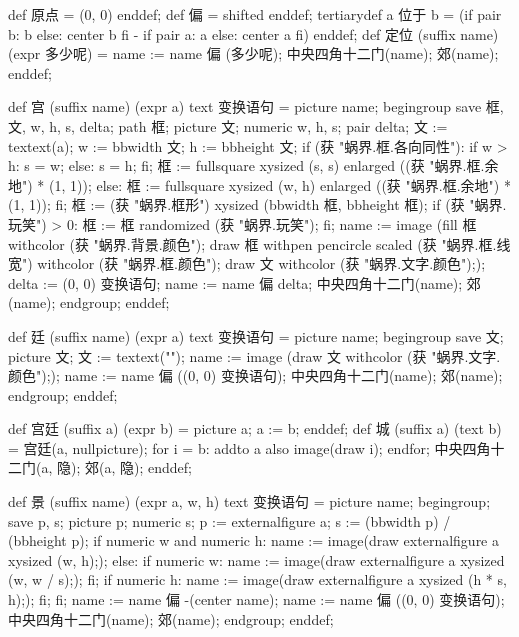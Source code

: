 \startMPinclusions[+]
def 原点 = (0, 0) enddef;
def 偏 = shifted enddef;
tertiarydef a 位于 b =
  (if pair b: b else: center b fi - if pair a: a else: center a fi)
enddef;
def 定位 (suffix name) (expr 多少呢) =
  name := name 偏 (多少呢);
  中央四角十二门(name); 郊(name);
enddef;
\stopMPinclusions

\startMPinclusions[+]
def 宫 (suffix name) (expr a) text 变换语句 =
  picture name;
  begingroup
  save 框, 文, w, h, s, delta;
  path 框; picture 文; numeric w, h, s; pair delta;
  文 := textext(a);
  w := bbwidth 文; h := bbheight 文;
  if (获 "蜗界.框.各向同性"):
    if w > h: s = w; else: s = h; fi;
    框 := fullsquare xysized (s, s) enlarged ((获 "蜗界.框.余地") * (1, 1));
  else:
    框 := fullsquare xysized (w, h) enlarged ((获 "蜗界.框.余地") * (1, 1));
  fi;
  框 := (获 "蜗界.框形") xysized (bbwidth 框, bbheight 框);
  if (获 "蜗界.玩笑") > 0: 框 := 框 randomized (获 "蜗界.玩笑"); fi;
  name := image (fill 框 withcolor (获 "蜗界.背景.颜色");
                 draw 框 withpen pencircle scaled (获 "蜗界.框.线宽")
                         withcolor (获 "蜗界.框.颜色");
                 draw 文 withcolor (获 "蜗界.文字.颜色"););
  delta := (0, 0) 变换语句;
  name := name 偏 delta;
  中央四角十二门(name); 郊(name);
  endgroup;
enddef;
\stopMPinclusions

\startMPinclusions[+]
def 廷 (suffix name) (expr a) text 变换语句 =
  picture name;
  begingroup
    save 文; picture 文; 文 := textext("");
    name := image (draw 文 withcolor (获 "蜗界.文字.颜色"););
    name := name 偏 ((0, 0) 变换语句); 中央四角十二门(name); 郊(name);
  endgroup;
enddef;
\stopMPinclusions

\startMPinclusions[+]
def 宫廷 (suffix a) (expr b) = picture a; a := b; enddef;
def 城 (suffix a) (text b) =
  宫廷(a, nullpicture);
  for i = b: addto a also image(draw i); endfor;
  中央四角十二门(a, 隐); 郊(a, 隐);
enddef;
\stopMPinclusions

\startMPinclusions[+]
def 景 (suffix name) (expr a, w, h) text 变换语句 =
  picture name;
  begingroup;
  save p, s; picture p; numeric s;
  p := externalfigure a;
  s := (bbwidth p) / (bbheight p);
  if numeric w and numeric h:
    name := image(draw externalfigure a xysized (w, h););
  else:
    if numeric w:
      name := image(draw externalfigure a xysized (w, w / s););
    fi;
    if numeric h:
       name := image(draw externalfigure a xysized (h * s, h););
    fi;
  fi;
  name := name 偏 -(center name); %
  name := name 偏 ((0, 0) 变换语句); 
  中央四角十二门(name); 郊(name);
  endgroup;
enddef;

